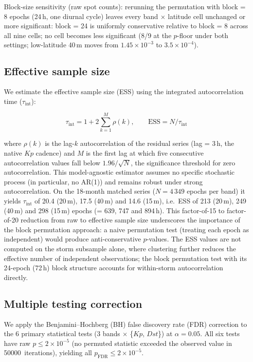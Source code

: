 \documentclass{agujournal2019}
\begin{document}
Block-size sensitivity (raw spot counts): rerunning the permutation with block = 8
epochs (24\,h, one diurnal cycle) leaves every band $\times$ latitude
cell unchanged or more significant: block = 24 is uniformly
conservative relative to block = 8 across all nine cells; no cell
becomes less significant (8/9 at the $p$-floor under both settings;
low-latitude 40\,m moves from $1.45 \times 10^{-3}$ to $3.5 \times 10^{-4}$).

\subsection{Effective sample size}

We estimate the effective sample size (ESS) using the integrated
autocorrelation time ($\tau_{\text{int}}$):

\begin{equation}
	\tau_{\text{int}} = 1 + 2 \sum_{k=1}^{M} \rho(k), \qquad
	\text{ESS} = N / \tau_{\text{int}}
	\label{eq:ess}
\end{equation}

where $\rho(k)$ is the lag-$k$ autocorrelation of the residual series
(lag = 3\,h, the native $Kp$ cadence) and $M$ is the first lag at which
five consecutive autocorrelation values fall below $1.96/\sqrt{N}$, the
significance threshold for zero autocorrelation. This model-agnostic
estimator assumes no specific stochastic process (in particular, no
AR(1)) and remains robust under strong autocorrelation. On the
18-month matched series ($N = 4\,349$ epochs per band) it yields
$\tau_{\text{int}}$ of 20.4 (20\,m), 17.5 (40\,m) and 14.6 (15\,m),
i.e.\ ESS of 213 (20\,m), 249 (40\,m) and 298 (15\,m) epochs
(= 639, 747 and 894\,h). This factor-of-15 to factor-of-20
reduction from raw to effective sample size underscores the importance
of the block permutation approach: a naive permutation test (treating
each epoch as independent) would produce anti-conservative $p$-values.
The ESS values are not computed on the storm subsample alone, where
clustering further reduces the effective number of independent
observations; the block permutation test with its 24-epoch (72\,h) block structure
accounts for within-storm autocorrelation directly.

\subsection{Multiple testing correction}

We apply the Benjamini--Hochberg (BH) false discovery rate (FDR) correction
\citep{benjamini1995} to the 6 primary statistical tests (3 bands $\times$
\{$Kp$, $Dst$\}) at $\alpha = 0.05$. All six tests have raw
$p \le 2 \times 10^{-5}$ (no permuted statistic exceeded the observed value in \SI{50000}{iterations}), yielding all $p_{\text{FDR}} \le 2 \times 10^{-5}$.
\end{document}

